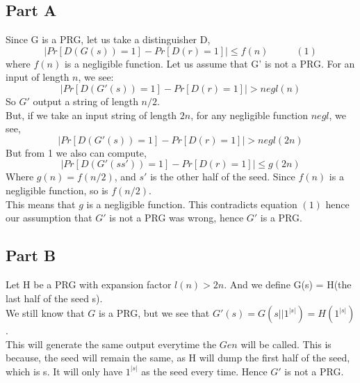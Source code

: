 \documentclass{article}
\begin{document}
        \subsection*{Part A}
            Since G is a PRG, let us take a distinguisher D,
            $$|Pr[D(G(s)) = 1] - Pr[D(r) = 1]|\leq f(n) \;\;\;\;\;\;\;\;\;\;(1)$$
            where $f(n)$ is a negligible function.
            Let us assume that G' is not a PRG. For an input of length $n$, we see:\\
            $$|Pr[D(G'(s)) = 1] - Pr[D(r) = 1]| > negl(n)$$
            So $G'$ output a string of length $n/2$.\\
            But, if we take an input string of length $2n$, for any negligible function $negl$, we see,\\
            $$|Pr[D(G'(s)) = 1] - Pr[D(r) = 1]| > negl(2n)$$
            But from 1 we also can compute,
            $$|Pr[D(G'(ss')) = 1] - Pr[D(r) = 1]|\leq g(2n)$$
            Where $g(n) = f(n/2)$, and $s'$ is the other half of the seed. Since $f(n)$ is a negligible function, so is $f(n/2)$.\\
            This means that $g$ is a negligible function. This contradicts equation $(1)$ hence our assumption that $G'$ is not a PRG was wrong, hence $G'$ is a PRG.

        \subsection*{Part B}
            Let H be a PRG with expansion factor $l(n) > 2n$. And we define G(s) = H(the last half of the seed s).\\
            We still know that $G$ is a PRG, but we see that $G'(s) = G(s||1^{|s|}) = H(1^{|s|})$.\\
            This will generate the same output everytime the $Gen$ will be called. This is because, the seed will remain the same, as H will dump the first half of the seed, which is s. It will only have $1^{|s|}$ as the seed every time. Hence $G'$ is not a PRG.
\end{document}
